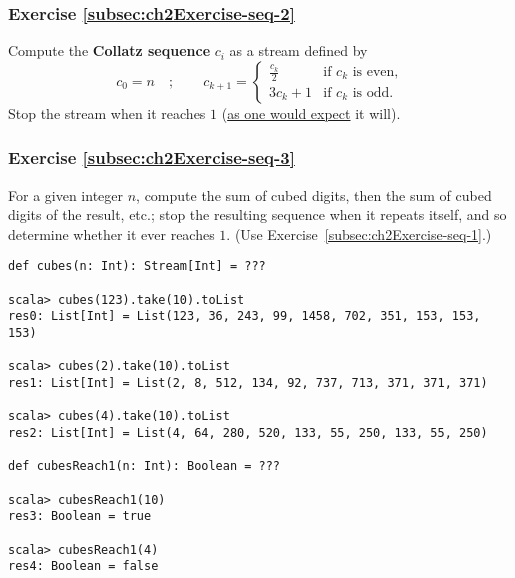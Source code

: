 \subsubsection{Exercise \label{subsec:ch2Exercise-seq-2}\ref{subsec:ch2Exercise-seq-2}}

Compute the \textbf{Collatz sequence} $c_{i}$
as a stream defined by
\[
c_{0}=n\quad;\quad\quad c_{k+1}=\begin{cases}
\frac{c_{k}}{2} & \text{if }c_{k}\text{ is even,}\\
3c_{k}+1 & \text{if }c_{k}\text{ is odd.}
\end{cases}
\]
Stop the stream when it reaches $1$ (\href{https://en.wikipedia.org/wiki/Collatz_conjecture}{as one would expect}
it will).

\subsubsection{Exercise \label{subsec:ch2Exercise-seq-3}\ref{subsec:ch2Exercise-seq-3}}

For a given integer $n$, compute the sum of cubed digits, then the
sum of cubed digits of the result, etc.; stop the resulting sequence
when it repeats itself, and so determine whether it ever reaches $1$.
(Use Exercise~\ref{subsec:ch2Exercise-seq-1}.)
\begin{lstlisting}
def cubes(n: Int): Stream[Int] = ???

scala> cubes(123).take(10).toList
res0: List[Int] = List(123, 36, 243, 99, 1458, 702, 351, 153, 153, 153)

scala> cubes(2).take(10).toList
res1: List[Int] = List(2, 8, 512, 134, 92, 737, 713, 371, 371, 371)

scala> cubes(4).take(10).toList
res2: List[Int] = List(4, 64, 280, 520, 133, 55, 250, 133, 55, 250)

def cubesReach1(n: Int): Boolean = ???

scala> cubesReach1(10)
res3: Boolean = true

scala> cubesReach1(4)
res4: Boolean = false
\end{lstlisting}
\begin{comment}
Solution:\inputencoding{latin9}
\begin{lstlisting}
def digitsOf(n: Int): Seq[Int] = Stream.iterate(n)(_ / 10).takeWhile(_ != 0).map(_ % 10).toList
def cubeDigits(n: Int): Int = digitsOf(n).map(x => x*x*x).sum
def cubes(n: Int): Stream[Int] = Stream.iterate(n)(cubeDigits)
def stopRepeats[T](str: Stream[T]): Stream[T] = {
  val halfSpeed = str.flatMap(x => Seq(x, x))
  val result = halfSpeed.zip(str).drop(1).takeWhile{ case (h, s) => h != s }.map(_._2)
  if (result.isEmpty) str.take(1) else str
}
def cubesReach1(n: Int): Boolean = stopRepeats(cubes(n)).contains(1)
\end{lstlisting}
\inputencoding{utf8}\end{comment}


